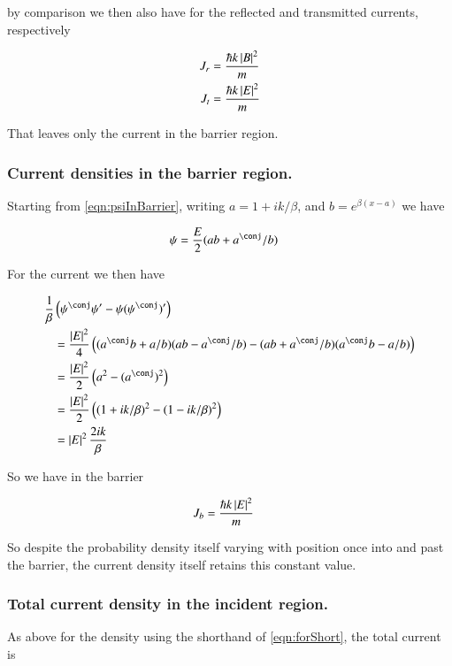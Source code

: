 \documentclass{article}
\begin{document}
by comparison we then also have for the reflected and transmitted currents, respectively

\begin{align}
J_r &= \frac{\hbar k \left\lvert{B}\right\rvert^2 }{m} \\
J_t &= \frac{\hbar k \left\lvert{E}\right\rvert^2 }{m}
\end{align}

That leaves only the current in the barrier region.

\subsubsection{ Current densities in the barrier region. }

Starting from \ref{eqn:psiInBarrier}, writing $a = 1 + ik/\beta$, and $b=e^{\beta(x-a)}$ we have

\begin{align*}
\psi &= \frac{E}{2} (a b + a^\conj/b)
\end{align*}

For the current we then have

\begin{align*}
\inv{\beta}&\left(\psi^\conj \psi' - \psi (\psi^\conj)' \right) \\
&=
\frac{\Abs{E}^2}{4}
\left(
(a^\conj b + a/b) (a b - a^\conj/b)
-(a b + a^\conj/b) (a^\conj b - a/b)
\right) \\
&=
\frac{\Abs{E}^2}{2} \left(a^2 - (a^\conj)^2 \right) \\
&=
\frac{\Abs{E}^2}{2} \left( 
(1 + ik/\beta)^2
-(1 - ik/\beta)^2
 \right) \\
&=
\Abs{E}^2 \frac{2ik}{\beta}
\end{align*}

So we have in the barrier

\begin{align*}
J_b 
&=
\frac{\hbar k \left\lvert{E}\right\rvert^2 }{m}
\end{align*}

So despite the probability density itself varying with position once into and past the barrier, the current density itself
retains this
constant value.

\subsubsection{ Total current density in the incident region. }

As above for the density using the shorthand of \ref{eqn:forShort}, the total current is
\end{document}
